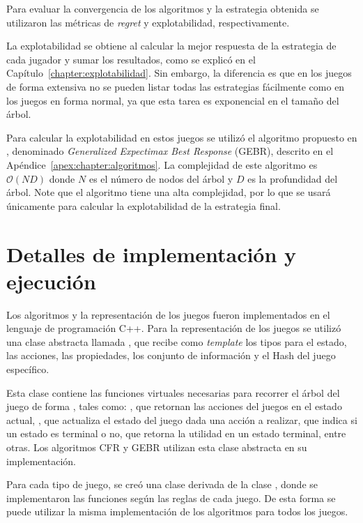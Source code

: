 Para evaluar la convergencia de los algoritmos y la estrategia obtenida se utilizaron las métricas de \textit{regret} y explotabilidad, respectivamente.

La explotabilidad se obtiene al calcular la mejor respuesta de la estrategia de cada jugador y sumar los resultados, como se explicó en el Capítulo~\ref{chapter:explotabilidad}. Sin embargo, la diferencia es que en los juegos de forma extensiva no se pueden listar todas las estrategias fácilmente como en los juegos en forma normal, ya que esta tarea es exponencial en el tamaño del árbol.

Para calcular la explotabilidad en estos juegos se utilizó el algoritmo propuesto en \cite{bib:thesis-marc-lanctot}, denominado \textit{Generalized Expectimax Best Response} (GEBR), descrito en el Apéndice~\ref{apex:chapter:algoritmos}. La complejidad de este algoritmo es $\mathcal{O}(ND)$ donde $N$ es el número de nodos del árbol y $D$ es la profundidad del árbol. Note que el algoritmo tiene una alta complejidad, por lo que se usará únicamente para calcular la explotabilidad de la estrategia final.


\section{Detalles de implementación y ejecución}

Los algoritmos y la representación de los juegos fueron implementados en el lenguaje de programación C++. Para la representación de los juegos se utilizó una clase abstracta llamada , que recibe como \textit{template} los tipos para el estado, las acciones, las propiedades, los conjunto de información y el Hash del juego específico.

Esta clase contiene las funciones virtuales necesarias para recorrer el árbol del juego de forma , tales como: , que retornan las acciones del juegos en el estado actual, , que actualiza el estado del juego dada una acción a realizar,  que indica si un estado es terminal o no,  que retorna la utilidad en un estado terminal, entre otras. Los algoritmos CFR y GEBR utilizan esta clase abstracta en su implementación.

Para cada tipo de juego, se creó una clase derivada de la clase , donde se implementaron las funciones según las reglas de cada juego. De esta forma se puede utilizar la misma implementación de los algoritmos para todos los juegos.

